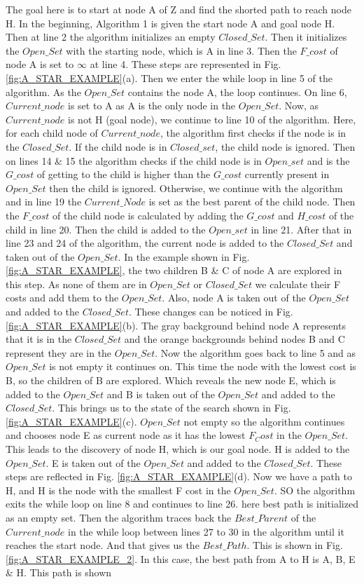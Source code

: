 The goal here is to start at node A of Z and find the shorted path to reach node H. In the beginning, Algorithm 1 is given the start node A and goal node H. Then at line 2 the algorithm initializes an empty $Closed\_Set$. Then it initializes the $Open\_Set$ with the starting node, which is A in line 3. Then the $F\_cost$ of node A is set to $\infty$ at line 4. These steps are represented in Fig.\ref{fig:A_STAR_EXAMPLE}(a).  Then we enter the while loop in line 5 of the algorithm. As the $Open\_Set$ contains the node A, the loop continues. On line 6, $Current\_node$ is set to A as A is the only node in the $Open\_Set$. Now, as $Current\_node$ is not H (goal node), we continue to line 10 of the algorithm. Here, for each child node of $Current\_node$, the algorithm first checks if the node is in the $Closed\_Set$. If the child node is in $Closed\_set$, the child node is ignored. Then on lines 14 \& 15 the algorithm checks if the child node is in $Open\_set$ and is the $G\_cost$ of getting to the child is higher than the $G\_cost$ currently present in $Open\_Set$ then the child is ignored. Otherwise, we continue with the algorithm and in line 19 the $Current\_Node$ is set as the best parent of the child node. Then the $F\_cost$ of the child node is calculated by adding the $G\_cost$ and $H\_cost$ of the child in line 20. Then the child is added to the $Open\_set$ in line 21. After that in line 23 and 24 of the algorithm, the current node is added to the $Closed\_Set$ and taken out of the $Open\_Set$. In the example shown in Fig. \ref{fig:A_STAR_EXAMPLE}, the two children B \& C of node A are explored in this step. As none of them are in $Open\_Set$ or $Closed\_Set$ we calculate their F costs and add them to the $Open\_Set$. Also, node A is taken out of the $Open\_Set$ and added to the $Closed\_Set$. These changes can be noticed in Fig. \ref{fig:A_STAR_EXAMPLE}(b). The gray background behind node A represents that it is in the $Closed\_Set$ and the orange backgrounds behind nodes B and C represent they are in the $Open\_Set$. Now the algorithm goes back to line 5 and as $Open\_Set$ is not empty it continues on. This time the node with the lowest cost is B, so the children of B are explored. Which reveals the new node E, which is added to the $Open\_Set$ and B is taken out of the $Open\_Set$ and added to the $Closed\_Set$. This brings us to the state of the search shown in Fig. \ref{fig:A_STAR_EXAMPLE}(c). $Open\_Set$ not empty so the algorithm continues and chooses node E as current node as it has the lowest $F_Cost$ in the $Open\_Set$. This leads to the discovery of node H, which is our goal node. H is added to the $Open\_Set$. E is taken out of the $Open\_Set$ and added to the $Closed\_Set$. These steps are reflected in Fig. \ref{fig:A_STAR_EXAMPLE}(d). Now we have a path to H, and H is the node with the smallest F cost in the $Open\_Set$. SO the algorithm exits the while loop on line 8 and continues to line 26. here best path is initialized as an empty set. Then the algorithm traces back the $Best\_Parent$ of the $Current\_node$ in the while loop between lines 27 to 30 in the algorithm until it reaches the start node. And that gives us the $Best\_Path$. This is shown in Fig. \ref{fig:A_STAR_EXAMPLE_2}. In this case, the best path from A to H is A, B, E \& H. This path is shown 